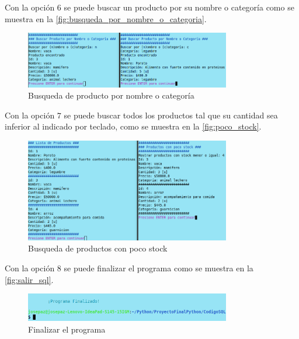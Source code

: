 \documentclass[12pt]{article}
\begin{document}
Con la opción $6$ se puede buscar un producto por su nombre o categoría como se muestra en la \autoref{fig:busqueda_por_nombre_o_categoria}.

\begin{figure}[H]
	\centering
	\setlength{\fboxrule}{0pt}
	\includegraphics[width=0.8\textwidth]{Imagenes/busqueda_por_nombre_o_categoria.png}
	\caption{Busqueda de producto por nombre o categoría}
	\label{fig:busqueda_por_nombre_o_categoria}
\end{figure}

Con la opción $7$ se puede buscar todos los productos tal que su cantidad sea inferior al indicado por teclado, como se muestra en la \autoref{fig:poco_stock}.

\begin{figure}[H]
	\centering
	\setlength{\fboxrule}{0pt}
	\includegraphics[width=0.8\textwidth]{Imagenes/poco_stock.png}
	\caption{Busqueda de productos con poco stock}
	\label{fig:poco_stock}
\end{figure}

Con la opción $8$ se puede finalizar el programa como se muestra en la \autoref{fig:salir_sql}.

\begin{figure}[H]
	\centering
	\setlength{\fboxrule}{0pt}
	\includegraphics[width=0.8\textwidth]{Imagenes/salir_sql.png}
	\caption{Finalizar el programa}
	\label{fig:salir_sql}
\end{figure}
\end{document}
